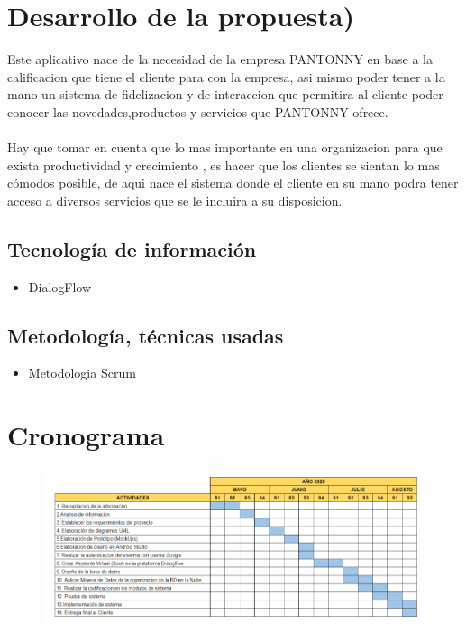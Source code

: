 \documentclass[preprint,12pt]{elsarticle}
\begin{document}
\section{Desarrollo de la propuesta)}
Este aplicativo nace de la necesidad de la empresa PANTONNY en base a la calificacion que tiene el cliente para con la empresa, asi mismo poder tener a la mano un sistema de fidelizacion y de interaccion que permitira al cliente poder conocer las novedades,productos y servicios que PANTONNY ofrece.
\\  \\
Hay que tomar en cuenta que lo mas importante en una organizacion para que exista productividad  y crecimiento , es hacer que los clientes se sientan lo mas cómodos posible, de aqui nace el sistema donde el cliente en su mano podra tener acceso a diversos servicios que se le incluira a su disposicion.


\subsection{\textbf{Tecnología de información}}
\begin{itemize}
	\item DialogFlow
\end{itemize}
\subsection{\textbf{Metodología, técnicas usadas}}
\begin{itemize}
	\item Metodologia Scrum
\end{itemize}



\section{Cronograma}
\begin{figure}[htb]
	\begin{center}
		\includegraphics[width=12cm]{./IMAGENES/cronograma} 
	\end{center}
\end{figure}



	
	\newpage
	


	
\end{document}
